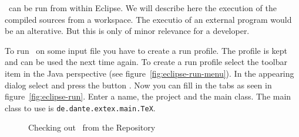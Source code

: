 \ExTeX\ can be run from within Eclipse. We will describe here the
execution of the compiled sources from a workspace. The executio of an
external program would be an alterative. But this is only of minor
relevance for a developer.

To run \ExTeX\ on some input file you have to create a run profile.
The profile is kept and can be used the next time again. To create a
run profile select the toolbar item  in the Java
perspective (see figure~\ref{fig:eclipse-run-menu}). In the appearing
dialog select  and press the button .
Now you can fill in the tabs as seen in figure~\ref{fig:eclipse-run}.
Enter a name, the project and the main class. The main class to use is
\texttt{de.dante.extex.main.TeX}.
\begin{figure}[htp]
  \hbox{}\hfill
  \hfill
  \caption{Checking out \ExTeX\ from the Repository}
\end{figure}

